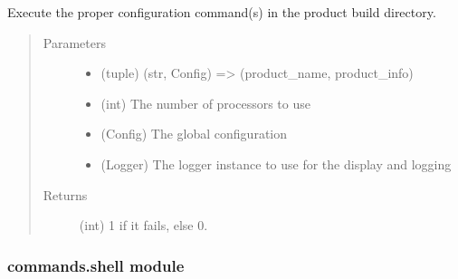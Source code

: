 \documentclass[a4paper,10pt,english]{sphinxmanual}
\begin{document}
\begin{fulllineitems}
\label{\detokenize{apidoc_commands/commands:commands.script.run_script_of_product}}
Execute the proper configuration command(s) 
in the product build directory.
\begin{quote}\begin{description}
\item[{Parameters}] \leavevmode\begin{itemize}
\item {} 
 \textendash{} (tuple) 
(str, Config) =\textgreater{} (product\_name, product\_info)

\item {} 
 \textendash{} (int) The number of processors to use

\item {} 
 \textendash{} (Config) The global configuration

\item {} 
 \textendash{} (Logger) 
The logger instance to use for the display and logging

\end{itemize}

\item[{Returns}] \leavevmode
(int) 1 if it fails, else 0.

\end{description}\end{quote}

\end{fulllineitems}



\subsubsection{commands.shell module}
\label{\detokenize{apidoc_commands/commands:module-commands.shell}}\label{\detokenize{apidoc_commands/commands:commands-shell-module}}
\end{document}
